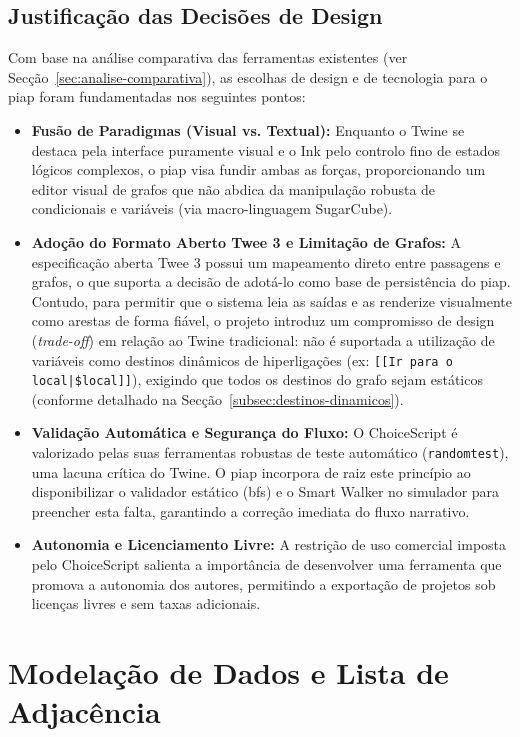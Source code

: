 \subsection{Justificação das Decisões de Design}
\label{subsec:justificacao-decisoes-design}
Com base na análise comparativa das ferramentas existentes (ver Secção~\ref{sec:analise-comparativa}), as escolhas de design e de tecnologia para o \gls{piap} foram fundamentadas nos seguintes pontos:
\begin{itemize}
    \item \textbf{Fusão de Paradigmas (Visual vs. Textual):} Enquanto o Twine se destaca pela interface puramente visual e o Ink pelo controlo fino de estados lógicos complexos, o \gls{piap} visa fundir ambas as forças, proporcionando um editor visual de grafos que não abdica da manipulação robusta de condicionais e variáveis (via macro-linguagem SugarCube).
    \item \textbf{Adoção do Formato Aberto Twee 3 e Limitação de Grafos:} A especificação aberta Twee 3 possui um mapeamento direto entre passagens e grafos, o que suporta a decisão de adotá-lo como base de persistência do \gls{piap}. Contudo, para permitir que o sistema leia as saídas e as renderize visualmente como arestas de forma fiável, o projeto introduz um compromisso de design (\textit{trade-off}) em relação ao Twine tradicional: não é suportada a utilização de variáveis como destinos dinâmicos de hiperligações (ex: \texttt{[[Ir para o local|\$local]]}), exigindo que todos os destinos do grafo sejam estáticos (conforme detalhado na Secção~\ref{subsec:destinos-dinamicos}).
    \item \textbf{Validação Automática e Segurança do Fluxo:} O ChoiceScript é valorizado pelas suas ferramentas robustas de teste automático (\texttt{randomtest}), uma lacuna crítica do Twine. O \gls{piap} incorpora de raiz este princípio ao disponibilizar o validador estático (\gls{bfs}) e o Smart Walker no simulador para preencher esta falta, garantindo a correção imediata do fluxo narrativo.
    \item \textbf{Autonomia e Licenciamento Livre:} A restrição de uso comercial imposta pelo ChoiceScript salienta a importância de desenvolver uma ferramenta que promova a autonomia dos autores, permitindo a exportação de projetos sob licenças livres e sem taxas adicionais.
\end{itemize}

\section{Modelação de Dados e Lista de Adjacência}
\label{sec:modelacao-dados-grafo}

